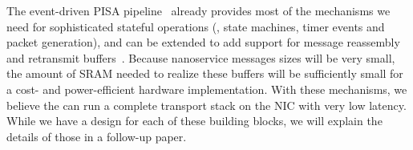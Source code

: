 The event-driven PISA pipeline~\cite{event-driven-pisa} already provides most of the mechanisms we need for sophisticated stateful operations (\eg, state machines, timer events and packet generation), and can be extended to add support for message reassembly and retransmit buffers~\cite{schuehler2004modular, intel-rapidio}. Because nanoservice messages sizes will be very small, the amount of SRAM needed to realize these buffers will be sufficiently small for a cost- and power-efficient hardware implementation. With these mechanisms, we believe the \name{} can run a complete transport stack on the NIC with very low latency. While we have a design for each of these building blocks, we will explain the details of those in a follow-up paper.
